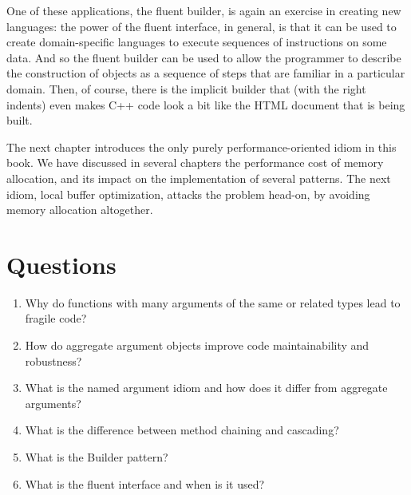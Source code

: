 One of these applications, the fluent builder, is again an exercise in creating new languages: the power of the fluent interface, in general, is that it can be used to create domain-specific languages to execute sequences of instructions on some data. And so the fluent builder can be used to allow the programmer to describe the construction of objects as a sequence of steps that are familiar in a particular domain. Then, of course, there is the implicit builder that (with the right indents) even makes C++ code look a bit like the HTML document that is being built.

The next chapter introduces the only purely performance-oriented idiom in this book. We have discussed in several chapters the performance cost of memory allocation, and its impact on the implementation of several patterns. The next idiom, local buffer optimization, attacks the problem head-on, by avoiding memory allocation altogether.

\section{Questions}

\begin{enumerate}
\item
  Why do functions with many arguments of the same or related types lead to fragile code?
\item
  How do aggregate argument objects improve code maintainability and robustness?
\item
  What is the named argument idiom and how does it differ from aggregate arguments?
\item
  What is the difference between method chaining and cascading?
\item
  What is the Builder pattern?
\item
  What is the fluent interface and when is it used?
\end{enumerate}

